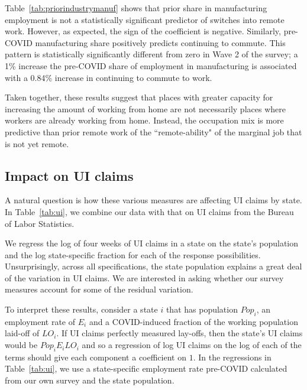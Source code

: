 \documentclass[12pt]{article}
\begin{document}


Table~\ref{tab:priorindustrymanuf} shows that prior share in manufacturing employment is not a statistically significant predictor of switches into remote work. However, as expected, the sign of the coefficient is negative. Similarly, pre-COVID manufacturing share positively predicts continuing to commute. This pattern is statistically significantly different from zero in Wave 2 of the survey; a 1\% increase the pre-COVID share of employment in manufacturing is associated with a 0.84\% increase in continuing to commute to work.



Taken together, these results suggest that places with greater capacity for increasing the amount of working from home are not necessarily places where workers are already working from home.  Instead, the occupation mix is more predictive than prior remote work of the ``remote-ability" of the marginal job that is not yet remote.

\subsection{Impact on UI claims} \label{sec:UI}

A natural question is how these various measures are affecting UI claims by state. 
In Table~\ref{tab:ui}, we combine our data with that on UI claims from the Bureau of Labor Statistics.

We regress the log of four weeks of UI claims in a state on the state's population and the log state-specific fraction for each of the response possibilities.  
Unsurprisingly, across all specifications, the state population explains a great deal of the variation in UI claims.
We are interested in asking whether our survey measures account for some of the residual variation.

To interpret these results, consider a state $i$ that has population $Pop_i$, an employment rate of $E_i$ and a COVID-induced fraction of the working population laid-off of $LO_i$. If UI claims perfectly measured lay-offs, then the state's UI claims would be $Pop_i E_i LO_i$ and so a regression of log UI claims on the log of each of the terms should give each component a coefficient on $1$. 
In the regressions in Table~\ref{tab:ui}, we use a state-specific employment rate pre-COVID calculated from our own survey and the state population. 


\end{document}
